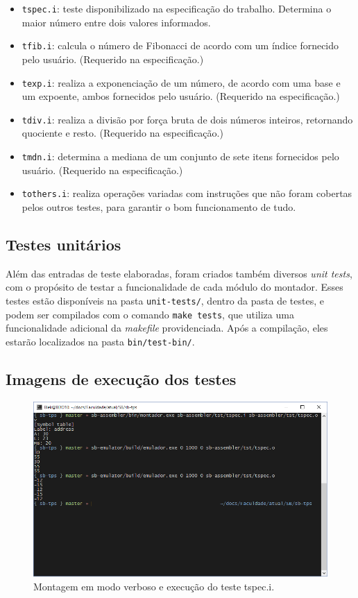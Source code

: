 \documentclass[10pt,a4paper]{article}
\numberwithin{equation}{section}
\begin{document}
\begin{itemize}
    \item \verb|tspec.i|: teste disponibilizado na especificação do trabalho. Determina o maior número entre dois valores informados.
    \item \verb|tfib.i|: calcula o número de Fibonacci de acordo com um índice fornecido pelo usuário. (Requerido na especificação.)
    \item \verb|texp.i|: realiza a exponenciação de um número, de acordo com uma base e um expoente, ambos fornecidos pelo usuário. (Requerido na especificação.)
    \item \verb|tdiv.i|: realiza a divisão por força bruta de dois números inteiros, retornando quociente e resto. (Requerido na especificação.)
    \item \verb|tmdn.i|: determina a mediana de um conjunto de sete itens fornecidos pelo usuário. (Requerido na especificação.)
    \item \verb|tothers.i|: realiza operações variadas com instruções que não foram cobertas pelos outros testes, para garantir o bom funcionamento de tudo.
\end{itemize}

\subsection{Testes unitários}

Além das entradas de teste elaboradas, foram criados também diversos \emph{unit tests}, com o propósito de testar a funcionalidade de cada módulo do montador. Esses testes estão disponíveis na pasta \verb|unit-tests/|, dentro da pasta de testes, e podem ser compilados com o comando \verb|make tests|, que utiliza uma funcionalidade adicional da \emph{makefile} providenciada. Após a compilação, eles estarão localizados na pasta \verb|bin/test-bin/|.

\subsection{Imagens de execução dos testes}

\begin{figure}[h]
    \includegraphics[scale=0.65]{imagens/tspec_console.png}
    \centering
    \caption{Montagem em modo verboso e execução do teste tspec.i.}
\end{figure}
\end{document}
